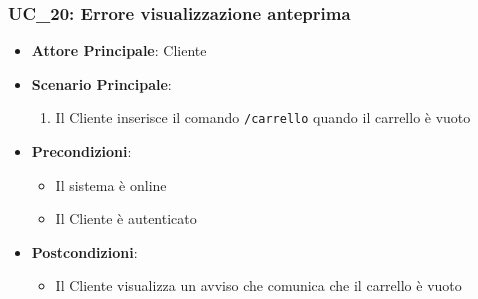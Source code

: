 \subsubsection{UC\_20: Errore visualizzazione anteprima}
\label{uc_20}

\begin{itemize}
    \item \textbf{Attore Principale}: Cliente
	 \item \textbf{Scenario Principale}:
    \begin{enumerate}
        \item Il Cliente inserisce il comando \texttt{/carrello} quando il carrello è vuoto
    \end{enumerate}
	\item \textbf{Precondizioni}:
	\begin{itemize}
		\item Il sistema è online
		\item Il Cliente è autenticato
	\end{itemize}
	\item \textbf{Postcondizioni}:
	\begin{itemize}
		\item Il Cliente visualizza un avviso che comunica che il carrello è vuoto
	\end{itemize}
\end{itemize}